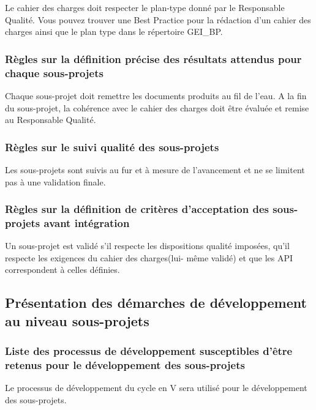             Le cahier des charges doit respecter le plan-type donné par le
            Responsable Qualité. Vous pouvez trouver une Best Practice pour la
            rédaction d'un cahier des charges ainsi que le plan type dans le 
            répertoire GEI_BP.

        \subsubsection{Règles sur la définition précise des résultats attendus 
            pour chaque sous-projets}

            Chaque sous-projet doit remettre les documents produits au fil de
            l'eau. A la fin du sous-projet, la cohérence avec le cahier des 
            charges doit être évaluée et remise au Responsable Qualité.            

        \subsubsection{Règles sur le suivi qualité des sous-projets}

            Les sous-projets sont suivis au fur et à mesure de l'avancement et 
            ne se limitent pas à une validation finale.

        \subsubsection{Règles sur la définition de critères d’acceptation des 
            sous-projets avant intégration}

            Un sous-projet est validé s'il respecte les dispositions qualité 
            imposées, qu'il respecte les exigences du cahier des charges(lui-
            même validé) et que les API correspondent à celles définies.

    \subsection{Présentation des démarches de développement au niveau 
            sous-projets}

        \subsubsection{Liste des processus de développement susceptibles d’être 
            retenus pour le développement des sous-projets}

            Le processus de développement du cycle en V sera utilisé pour le
            développement des sous-projets.

